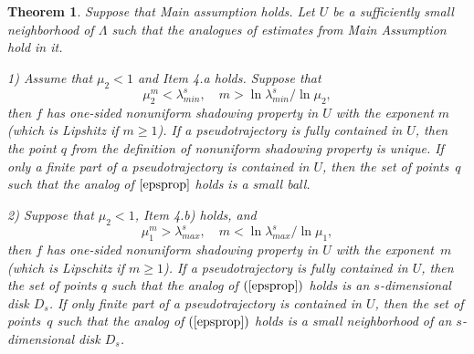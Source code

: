 \documentclass[11pt]{article}
\newcounter{razdel}[section]
\theoremstyle{Mystyle}
\newtheorem{Theorem}[razdel]{Theorem}
\begin{document}
\begin{Theorem} 
\label{ThM}
Suppose that Main assumption holds. Let $U$ be a sufficiently small neighborhood of $\Lambda$ such that the analogues of estimates from Main Assumption hold in it.

1) Assume that $\mu_2<1$ and Item 4.a holds. %
Suppose that
\begin{equation}
\label{muineq}
\mu_2^m < \lambda^s_{min},\quad m>\ln \lambda^s_{min}/\ln\mu_2,
\end{equation}
then $f$ has one-sided nonuniform shadowing property in $U$ with the exponent $m$ (which is Lipshitz if $m\geq 1$). If a pseudotrajectory is fully contained in $U$, then the point $q$ from the definition of nonuniform shadowing property is unique. If only a finite part of a pseudotrajectory is contained in $U$, then the set of points~$q$ such that the analog of $\eqref{epsprop}$ holds is a small ball.

2) Suppose that $\mu_2<1$, Item 4.b) holds, and
\begin{equation}
\label{muineq2}
\mu_1^m > \lambda^{s}_{max},\quad m<\ln \lambda^{s}_{max}/\ln\mu_1,
\end{equation}
then $f$ has  one-sided nonuniform shadowing property in $U$ with the exponent~$m$ (which is Lipschitz if $m\geq 1$). %
 If a pseudotrajectory is fully contained in $U$, then the set of points $q$ such that the analog of $(\ref{epsprop})$ holds is an $s$-dimensional disk $D_s$. If only finite part of a pseudotrajectory is contained in $U$, then the set of points~$q$ such that the analog of $(\ref{epsprop})$ holds is a small neighborhood of an $s$-dimensional disk $D_s$.
 



\end{Theorem}
\end{document}
